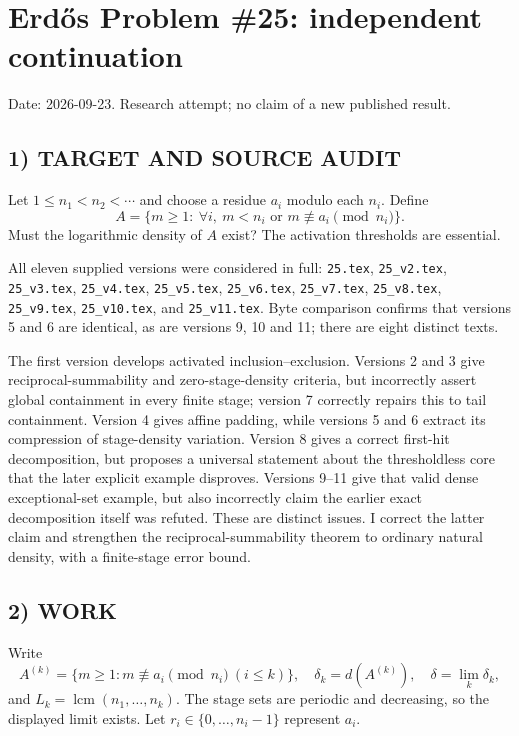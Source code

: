\section{Erd\H{o}s Problem \#25: independent continuation}
\noindent Date: 2026-09-23. Research attempt; no claim of a new published result.

\subsection{1) TARGET AND SOURCE AUDIT}
Let $1\le n_1<n_2<\cdots$ and choose a residue $a_i$ modulo each $n_i$. Define
\[
 A=\{m\ge1:\ \forall i,\ m<n_i\text{ or }m\not\equiv a_i\pmod{n_i}\}.
\]
Must the logarithmic density of $A$ exist? The activation thresholds are essential.

All eleven supplied versions were considered in full: \texttt{25.tex}, \texttt{25\_v2.tex}, \texttt{25\_v3.tex}, \texttt{25\_v4.tex}, \texttt{25\_v5.tex}, \texttt{25\_v6.tex}, \texttt{25\_v7.tex}, \texttt{25\_v8.tex}, \texttt{25\_v9.tex}, \texttt{25\_v10.tex}, and \texttt{25\_v11.tex}. Byte comparison confirms that versions 5 and 6 are identical, as are versions 9, 10 and 11; there are eight distinct texts.

The first version develops activated inclusion--exclusion. Versions 2 and 3 give reciprocal-summability and zero-stage-density criteria, but incorrectly assert global containment in every finite stage; version 7 correctly repairs this to tail containment. Version 4 gives affine padding, while versions 5 and 6 extract its compression of stage-density variation. Version 8 gives a correct first-hit decomposition, but proposes a universal statement about the thresholdless core that the later explicit example disproves. Versions 9--11 give that valid dense exceptional-set example, but also incorrectly claim the earlier exact decomposition itself was refuted. These are distinct issues. I correct the latter claim and strengthen the reciprocal-summability theorem to ordinary natural density, with a finite-stage error bound.

\subsection{2) WORK}
Write
\[
 A^{(k)}=\{m\ge1:m\not\equiv a_i\pmod{n_i}\ (i\le k)\},\quad
 \delta_k=d(A^{(k)}),\quad \delta=\lim_k\delta_k,
\]
and $L_k=\operatorname{lcm}(n_1,\ldots,n_k)$. The stage sets are periodic and decreasing, so the displayed limit exists. Let $r_i\in\{0,\ldots,n_i-1\}$ represent $a_i$.

